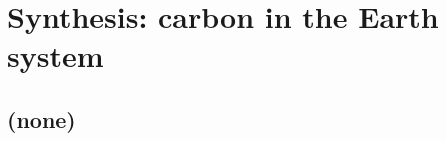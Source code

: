 
\cleardoublepage


\chapter{Synthesis: carbon in the Earth system}\label{ch:synthesis}

\hfill \break

\newpage

\section{(none)}

